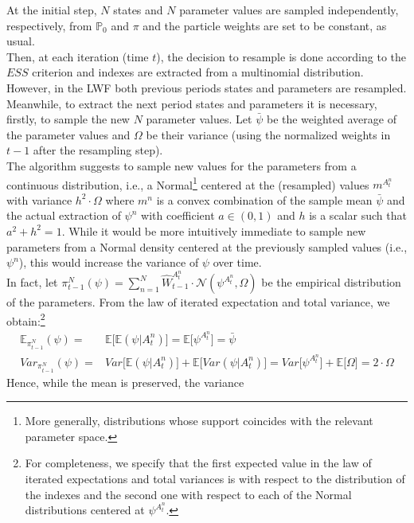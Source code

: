 \documentclass[
]{book}
\theoremstyle{break}
\theoremstyle{nonumberplain}
\begin{document}
At the initial step, \(N\) states and \(N\) parameter values are sampled
independently, respectively, from \(\mathbb P_0\) and \(\pi\) and the
particle weights are set to be constant, as usual.\\
Then, at each iteration (time \(t\)), the decision to resample is done
according to the \(ESS\) criterion and indexes are extracted from a
multinomial distribution. However, in the LWF both previous periods
states and parameters are resampled.\\
Meanwhile, to extract the next period states and parameters it is
necessary, firstly, to sample the new \(N\) parameter values. Let
\(\bar \psi\) be the weighted average of the parameter values and
\(\Omega\) be their variance (using the normalized weights in \(t-1\)
after the resampling step).~\\
The algorithm suggests to sample new values for the parameters from a
continuous distribution, i.e., a
Normal\footnote{More generally, distributions whose support coincides with the relevant parameter space.}
centered at the (resampled) values \(m^{A_t^n}\) with variance
\(h^2\cdot \Omega\) where \(m^n\) is a convex combination of the sample
mean \(\bar\psi\) and the actual extraction of \(\psi^n\) with
coefficient \(a\in (0,1)\) and \(h\) is a scalar such that
\(a^2+h^2=1\). While it would be more intuitively immediate to sample
new parameters from a Normal density centered at the previously sampled
values (i.e., \(\psi^n\)), this would increase the variance of \(\psi\)
over time.\\
In fact, let
\(\pi_{t-1}^N(\psi)=\sum_{n=1}^N \hat W_{t-1}^{A_t^{n}}\cdot \mathcal N(\psi^{A_t^{n}},\Omega)\)
be the empirical distribution of the parameters. From the law of
iterated expectation and total variance, we
obtain:\footnote{For completeness, we specify that the first expected value in the law of iterated expectations and total variances is with respect to the distribution of the indexes and the second one with respect to each of the Normal distributions centered at $\psi^{A_t^{n}}$.}
\begin{equation*}
    \begin{split}
        \mathbb E_{\pi_{t-1}^N} ( \psi)=& \mathbb E\big[\mathbb E( \psi|A_t^{n})\big]=\mathbb E\big[\psi^{A_t^{n}}\big]=\bar \psi\\
        Var_{\pi_{t-1}^N} ( \psi)=&Var\big[\mathbb E( \psi|A_t^{n})\big]+\mathbb E\big[Var( \psi|A_t^{n})\big]=Var\big[\psi^{A_t^{n}}\big]+\mathbb E\big[\Omega\big]=2\cdot\Omega
    \end{split}
\end{equation*} Hence, while the mean is preserved, the variance
\end{document}

